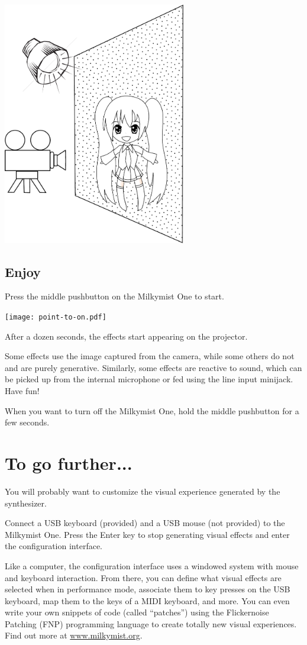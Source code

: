 \documentclass{leaflet}
\begin{document}
\includegraphics[width=80mm]{camsetup.pdf}

\subsection{Enjoy}
Press the middle pushbutton on the Milkymist One to start.

\texttt{[image: point-to-on.pdf]}

After a dozen seconds, the effects start appearing on the projector.

Some effects use the image captured from the camera, while some others do not and are purely generative. Similarly, some effects are reactive to sound, which can be picked up from the internal microphone or fed using the line input minijack. Have fun!

When you want to turn off the Milkymist One, hold the middle pushbutton for a few seconds.

\section{To go further...}
You will probably want to customize the visual experience generated by the synthesizer.

Connect a USB keyboard (provided) and a USB mouse (not provided) to the Milkymist One. Press the Enter key to stop generating visual effects and enter the configuration interface.

Like a computer, the configuration interface uses a windowed system with mouse and keyboard interaction. From there, you can define what visual effects are selected when in performance mode, associate them to key presses on the USB keyboard, map them to the keys of a MIDI keyboard, and more. You can even write your own snippets of code (called ``patches'') using the Flickernoise Patching (FNP) programming language to create totally new visual experiences. Find out more at \url{www.milkymist.org}.
\end{document}
